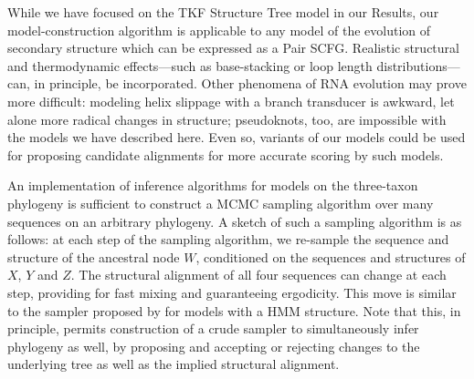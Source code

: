 \documentclass[10pt]{article}
\begin{document}


While we have focused on the TKF Structure Tree model in our Results,
our model-construction algorithm is applicable to any model of the evolution of secondary
structure which can be expressed as a Pair SCFG.
Realistic structural and thermodynamic effects---such as base-stacking
or loop length distributions---can, in principle, be incorporated.
Other phenomena of RNA evolution may prove more difficult:
modeling helix slippage with a branch transducer is awkward,
let alone more radical changes in structure;
pseudoknots, too, are impossible with the models we have described here.
Even so, variants of our models could be used for proposing candidate alignments
for more accurate scoring by such models.

An implementation of inference algorithms for models on the three-taxon phylogeny
is sufficient to construct a MCMC sampling algorithm
over many sequences on an arbitrary phylogeny.
A sketch of such a sampling algorithm is as follows:
at each step of the sampling algorithm, we re-sample the sequence
and structure of the ancestral node $W$,
conditioned on the sequences and structures of $X$, $Y$ and $Z$.
The structural alignment of all four sequences can change at each step,
providing for fast mixing and guaranteeing ergodicity.
This move is similar to the sampler proposed by \cite{JensenHein2002} for 
models with a HMM structure.
Note that this, in principle, permits construction of a crude sampler
to simultaneously infer phylogeny as well, by proposing and accepting
or rejecting changes to the underlying tree as well as the implied
structural alignment.
\end{document}
